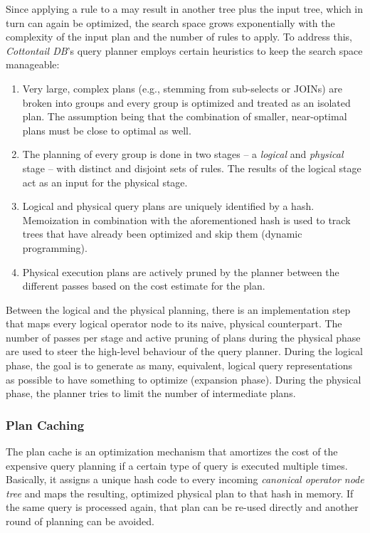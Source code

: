 Since applying a rule to a may result in another tree plus the input tree, which in turn can again be optimized, the search space grows exponentially with the complexity of the input plan and the number of rules to apply. To address this, \emph{Cottontail DB}'s query planner employs certain heuristics to keep the search space manageable:

\begin{enumerate}
    \item Very large, complex plans (e.g., stemming from sub-selects or JOINs) are broken into groups and every group is optimized and treated as an isolated plan. The assumption being that the combination of smaller, near-optimal plans must be close to optimal as well.
    \item The planning of every group is done in two stages -- a \emph{logical} and \emph{physical} stage -- with distinct and disjoint sets of rules. The results of the logical stage act as an input for the physical stage.
    \item Logical and physical query plans are uniquely identified by a hash. Memoization in combination with the aforementioned hash is used to track trees that have already been optimized and skip them (dynamic programming).
    \item Physical execution plans are actively pruned by the planner between the different passes based on the cost estimate for the plan.
\end{enumerate}

Between the logical and the physical planning, there is an implementation step that maps every logical operator node to its naive, physical counterpart. The number of passes per stage and active pruning of plans during the physical phase are used to steer the high-level behaviour of the query planner. During the logical phase, the goal is to generate as many, equivalent, logical query representations as possible to have something to optimize (expansion phase). During the physical phase, the planner tries to limit the number of intermediate plans.

\subsubsection{Plan Caching}

The plan cache is an optimization mechanism that amortizes the cost of the expensive query planning if a certain type of query is executed multiple times. Basically, it assigns a unique hash code to every incoming \emph{canonical operator node tree} and maps the resulting, optimized physical plan to that hash in memory. If the same query is processed again, that plan can be re-used directly and another round of planning can be avoided.

